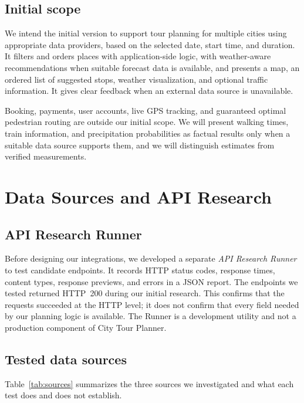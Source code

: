 \documentclass[a4paper,10pt]{article}
\begin{document}
\subsection{Initial scope}
We intend the initial version to support tour planning for multiple cities using appropriate data providers, based on the selected date, start time, and duration. It filters and orders places with application-side logic, with weather-aware recommendations when suitable forecast data is available, and presents a map, an ordered list of suggested stops, weather visualization, and optional traffic information. It gives clear feedback when an external data source is unavailable.

Booking, payments, user accounts, live GPS tracking, and guaranteed optimal pedestrian routing are outside our initial scope. We will present walking times, train information, and precipitation probabilities as factual results only when a suitable data source supports them, and we will distinguish estimates from verified measurements.

\section{Data Sources and API Research}
\subsection{API Research Runner}
Before designing our integrations, we developed a separate \emph{API Research Runner} to test candidate endpoints. It records HTTP status codes, response times, content types, response previews, and errors in a JSON report. The endpoints we tested returned HTTP~200 during our initial research. This confirms that the requests succeeded at the HTTP level; it does not confirm that every field needed by our planning logic is available. The Runner is a development utility and not a production component of City Tour Planner.

\subsection{Tested data sources}
Table~\ref{tab:sources} summarizes the three sources we investigated and what each test does and does not establish.
\end{document}
